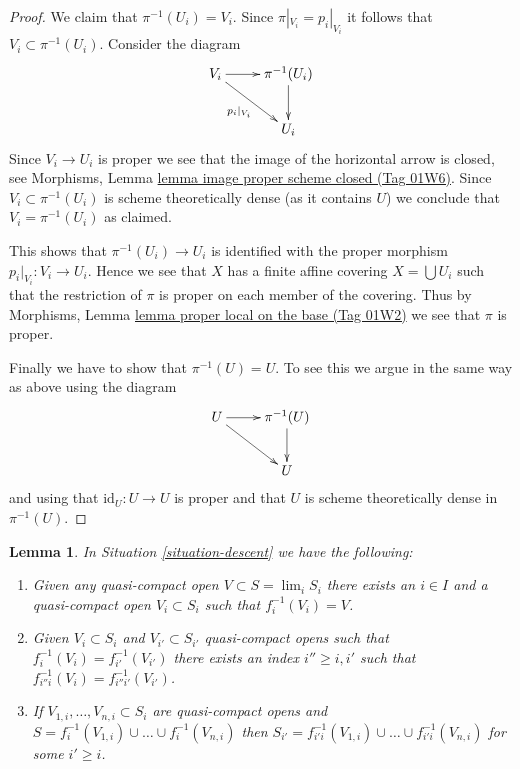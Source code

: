 \documentclass{amsart}
\theoremstyle{plain}
\newtheorem{lemma}[subsection]{Lemma}
\theoremstyle{definition}
\theoremstyle{remark}
\numberwithin{equation}{subsection}
\def\lim{\mathop{\mathrm{lim}}\nolimits}
\begin{document}
\begin{proof}
\medskip\noindent
We claim that $\pi^{-1}(U_i) = V_i$.
Since $\pi|_{V_i} = p_i|_{V_i}$ it follows that
$V_i \subset \pi^{-1}(U_i)$. Consider the diagram
$$
\xymatrix{
V_i \ar[r] \ar[rd]_{p_i|_{V_i}} & \pi^{-1}(U_i) \ar[d] \\
& U_i
}
$$
Since $V_i \to U_i$ is proper we see that the image of
the horizontal arrow is closed, see
Morphisms, Lemma \href{https://stacks.math.columbia.edu/tag/01W6}{lemma image proper scheme closed (Tag 01W6)}.
Since $V_i \subset \pi^{-1}(U_i)$ is scheme
theoretically dense (as it contains $U$)
we conclude that $V_i = \pi^{-1}(U_i)$ as claimed.

\medskip\noindent
This shows that $\pi^{-1}(U_i) \to U_i$ is identified with the proper
morphism $p_i|_{V_i} : V_i \to U_i$. Hence we see that $X$ has a
finite affine covering $X = \bigcup U_i$ such that the restriction
of $\pi$ is proper on each member of the covering.
Thus by Morphisms, Lemma \href{https://stacks.math.columbia.edu/tag/01W2}{lemma proper local on the base (Tag 01W2)}
we see that $\pi$ is proper.

\medskip\noindent
Finally we have to show that $\pi^{-1}(U) = U$. To see this we argue in the
same way as above using the diagram
$$
\xymatrix{
U \ar[r] \ar[rd] & \pi^{-1}(U) \ar[d] \\
& U
}
$$
and using that $\text{id}_U : U \to U$ is proper and that
$U$ is scheme theoretically dense in $\pi^{-1}(U)$.
\end{proof}


\begin{lemma}
\label{lemma-descend-opens}
In Situation \ref{situation-descent} we have the following:
\begin{enumerate}
\item Given any quasi-compact open $V \subset S = \lim_i S_i$
there exists an $i \in I$ and a quasi-compact open $V_i \subset S_i$
such that $f_i^{-1}(V_i) = V$.
\item Given $V_i \subset S_i$ and $V_{i'} \subset S_{i'}$
quasi-compact opens such that $f_i^{-1}(V_i) = f_{i'}^{-1}(V_{i'})$
there exists an index $i'' \geq i, i'$ such that
$f_{i''i}^{-1}(V_i) = f_{i''i'}^{-1}(V_{i'})$.
\item If $V_{1, i}, \ldots, V_{n, i} \subset S_i$ are quasi-compact
opens and $S = f_i^{-1}(V_{1, i}) \cup \ldots \cup f_i^{-1}(V_{n, i})$
then $S_{i'} = f_{i'i}^{-1}(V_{1, i}) \cup \ldots \cup f_{i'i}^{-1}(V_{n, i})$
for some $i' \geq i$.
\end{enumerate}
\end{lemma}
\end{document}
